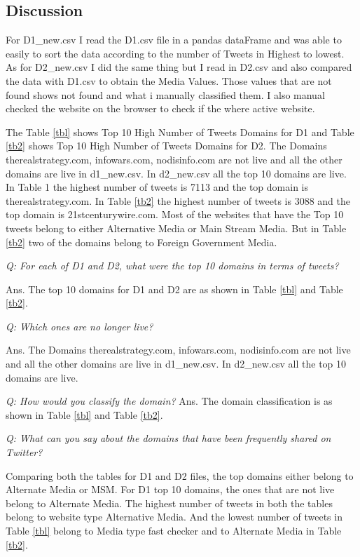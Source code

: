\documentclass[12pt]{article}
\begin{document}
\subsection*{Discussion}
For D1\_new.csv I read the D1.csv file in a pandas dataFrame and was able to easily to sort the data according to the number of Tweets in Highest to lowest. As for D2\_new.csv I did the same thing but I read in D2.csv and also compared the data with D1.csv to obtain the Media Values. Those values that are not found shows not found and what i manually classified them. I also manual checked the website on the browser to check if the where active website.

The Table \ref{tbl} shows Top 10 High Number of Tweets Domains for D1 and Table \ref{tb2} shows Top 10 High Number of Tweets Domains for D2. The Domains therealstrategy.com, infowars.com, nodisinfo.com are not live and all the other domains are live in d1\_new.csv. In d2\_new.csv all the top 10 domains are live. In Table 1 the highest number of tweets is 7113 and the top domain is therealstrategy.com. In Table \ref{tb2} the highest number of tweets is 3088 and the top domain is 21stcenturywire.com. Most of
the websites that have the Top 10 tweets belong to either Alternative Media or Main Stream Media. But in Table \ref{tb2} two of the domains belong to Foreign Government Media.

\emph{Q: For each of D1 and D2, what were the top 10 domains in terms of tweets?}

Ans. The top 10 domains for D1 and D2 are as shown in Table \ref{tbl} and Table \ref{tb2}.


\emph{Q: Which ones are no longer live?}

Ans. The Domains therealstrategy.com, infowars.com, nodisinfo.com are not live and all the other domains are live in d1\_new.csv. In d2\_new.csv all the top 10 domains are live.

\emph{Q: How would you classify the domain?}
Ans. The domain classification is as shown in Table \ref{tbl} and Table \ref{tb2}.

\emph{Q: What can you say about the domains that have been frequently shared on Twitter?}

Comparing both the tables for D1 and D2 files, the top domains either belong to Alternate Media or MSM. For D1 top 10 domains, the ones that are not live belong to Alternate Media. The highest number of tweets in both the tables belong to website type Alternative Media. And the lowest number of tweets in Table \ref{tbl} belong to Media type fast checker and to Alternate Media in Table \ref{tb2}.
\end{document}
